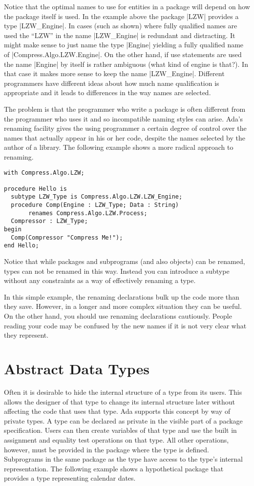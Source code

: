 Notice that the optimal names to use for entities in a package will depend on how the package
itself is used. In the example above the package |LZW| provides a type |LZW_Engine|. In cases
(such as shown) where fully qualified names are used the ``LZW'' in the name |LZW_Engine| is
redundant and distracting. It might make sense to just name the type |Engine| yielding a fully
qualified name of |Compress.Algo.LZW.Engine|. On the other hand, if use statements are used the
name |Engine| by itself is rather ambiguous (what kind of engine is that?). In that case it
makes more sense to keep the name |LZW_Engine|. Different programmers have different ideas about
how much name qualification is appropriate and it leads to differences in the way names are
selected.

The problem is that the programmer who write a package is often different from the programmer
who uses it and so incompatible naming styles can arise. Ada's renaming facility gives the using
programmer a certain degree of control over the names that actually appear in his or her code,
despite the names selected by the author of a library. The following example shows a more
radical approach to renaming.

\begin{lstlisting}
with Compress.Algo.LZW;

procedure Hello is
  subtype LZW_Type is Compress.Algo.LZW.LZW_Engine;
  procedure Comp(Engine : LZW_Type; Data : String)
       renames Compress.Algo.LZW.Process;
  Compressor : LZW_Type;
begin
  Comp(Compressor "Compress Me!");
end Hello;
\end{lstlisting}

Notice that while packages and subprograms (and also objects) can be renamed, types can not be
renamed in this way. Instead you can introduce a subtype without any constraints as a way of
effectively renaming a type.

In this simple example, the renaming declarations bulk up the code more than they save. However,
in a longer and more complex situation they can be useful. On the other hand, you should use
renaming declarations cautiously. People reading your code may be confused by the new names if
it is not very clear what they represent.

\section{Abstract Data Types}

Often it is desirable to hide the internal structure of a type from its users. This allows the
designer of that type to change its internal structure later without affecting the code that
uses that type. Ada supports this concept by way of private types. A type can be declared as
private in the visible part of a package specification. Users can then create variables of that
type and use the built in assignment and equality test operations on that type. All other
operations, however, must be provided in the package where the type is defined. Subprograms in
the same package as the type have access to the type's internal representation. The following
example shows a hypothetical package that provides a type representing calendar dates.


